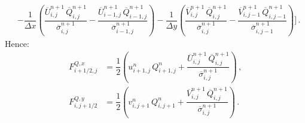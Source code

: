 \documentclass{article}
\numberwithin{equation}{section}
\begin{document}
\begin{enumerate}
\begin{equation}
\begin{aligned}
						& - \dfrac{1}{\Delta x} \left( \dfrac{\overline{U}_{i,j}^{n+1} \, \overline{Q}_{i,j}^{n+1}}{\overline{\sigma}_{i,j}^{n+1}} - \dfrac{\overline{U}_{i-1,j}^{n+1} \, \overline{Q}_{i-1,j}^{n+1}}{\overline{\sigma}_{i-1,j}^{n+1}} \right) - \dfrac{1}{\Delta y} \left( \dfrac{\overline{V}_{i,j}^{n+1} \, \overline{Q}_{i,j}^{n+1}}{\overline{\sigma}_{i,j}^{n+1}} - \dfrac{\overline{V}_{i,j-1}^{n+1} \, \overline{Q}_{i,j-1}^{n+1}}{\overline{\sigma}_{i,j-1}^{n+1}} \right) \Biggr] \, .
					\end{aligned}
				\end{equation}
			Hence:
				\begin{subequations}
					\begin{align}
						F_{i+1/2,j}^{Q,x} & = \dfrac{1}{2} \left( u_{i+1,j}^n \, Q_{i+1,j}^n + \dfrac{\overline{U}_{i,j}^{n+1} \, \overline{Q}_{i,j}^{n+1}}{\overline{\sigma}_{i,j}^{n+1}} \right) \, , \\
						F_{i,j+1/2}^{Q,y} & = \dfrac{1}{2} \left( v_{i,j+1}^n \, Q_{i,j+1}^n + \dfrac{\overline{V}_{i,j}^{n+1} \, \overline{Q}_{i,j}^{n+1}}{\overline{\sigma}_{i,j}^{n+1}} \right) \, .
					\end{align}
				\end{subequations}
		\end{enumerate}
\end{document}
